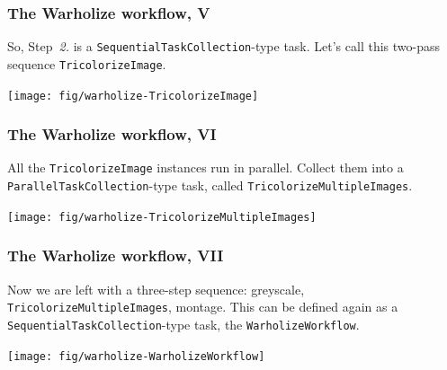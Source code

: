 \documentclass[english,serif,mathserif,xcolor=pdftex,dvipsnames,table]{beamer}
\begin{document}
\begin{frame}
  \frametitle{The Warholize workflow, V}

  So, Step~\textit{2.} is a \texttt{SequentialTaskCollection}-type task.
  Let's call this two-pass sequence \texttt{TricolorizeImage}.

  \+
  \texttt{[image: fig/warholize-TricolorizeImage]}
\end{frame}


\begin{frame}
  \frametitle{The Warholize workflow, VI}

  All the \texttt{TricolorizeImage} instances run in parallel. Collect
  them into a \texttt{ParallelTaskCollection}-type task, called
  \texttt{TricolorizeMultipleImages}.

  \+
  \texttt{[image: fig/warholize-TricolorizeMultipleImages]}
\end{frame}

\begin{frame}
  \frametitle{The Warholize workflow, VII}

  Now we are left with a three-step sequence: greyscale,
  \texttt{TricolorizeMultipleImages}, montage.  This can be defined
  again as a \texttt{SequentialTaskCollection}-type task, the
  \texttt{WarholizeWorkflow}.

  \+
  \texttt{[image: fig/warholize-WarholizeWorkflow]}
\end{frame}
\end{document}
